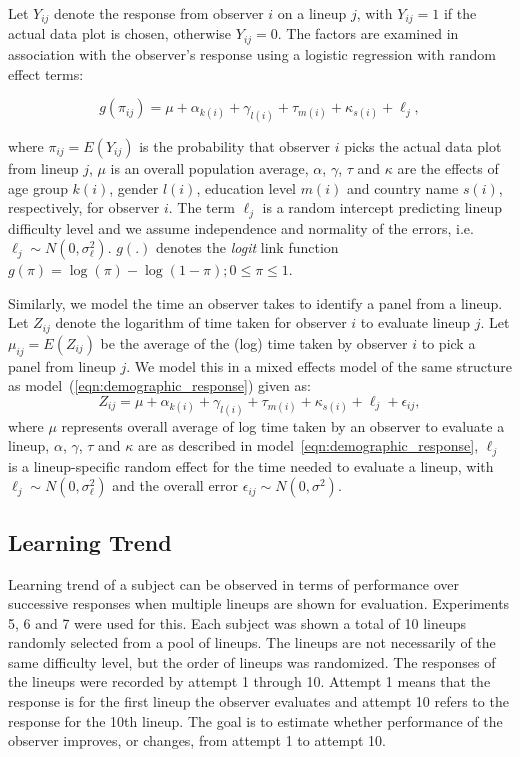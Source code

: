 \documentclass[10pt]{article}\usepackage[]{graphicx}\usepackage[]{xcolor}
\newcommand{\hh}[1]{{\color{magenta} #1}}
\begin{document}
Let $Y_{ij}$ denote the response from observer $i$ on a lineup $j$, with $Y_{ij} =1$ if the actual data plot is chosen, otherwise $Y_{ij} =0$. The factors are examined in association with the observer's response using a logistic regression with random effect terms:

\begin{equation} \label{eqn:demographic_response}
g( \pi_{ij} )= \mu + \alpha_{k(i)} + \gamma_{l(i)} + \tau_{m(i)}+ \kappa_{s(i)} + \ell_j,  
\end{equation}

where $\pi_{ij}=  E(Y_{ij})$ is the probability that  observer $i$ picks the actual data plot from lineup $j$, $\mu$ is an overall population average, $\alpha$, $\gamma$, $\tau$ and  $\kappa$ are the effects of age group $k(i)$, gender $l(i)$, education level $m(i)$ and country name $s(i)$, respectively, for observer $i$. The term $\ell_j$ is a random intercept predicting lineup difficulty level and we assume independence and normality of the errors, i.e.\ $\ell_j \sim N(0, \sigma_\ell^2)$.  $g(.)$ denotes the {\it logit} link function $g(\pi)=\log(\pi) - \log(1-\pi); 0 \le \pi \le 1$.


Similarly, we model the  time  an observer takes to identify a panel from a lineup. Let $Z_{ij}$ denote the logarithm of time taken for  observer $i$ to evaluate  lineup $j$. Let $\mu_{ij}=  E(Z_{ij})$ be the average of the (log) time taken by  observer $i$ to pick a panel from lineup $j$. We model this in a mixed effects model of the same structure as model~(\ref{eqn:demographic_response}) given as:
\begin{equation} \label{eqn:demographic_time}
Z_{ij} = \mu + \alpha_{k(i)} + \gamma_{l(i)} + \tau_{m(i)}+ \kappa_{s(i)} + \ell_j+ \epsilon_{ij},  
\end{equation}
where $\mu$ represents overall average of log time taken by an observer to evaluate a lineup, $\alpha$, $\gamma$, $\tau$ and  $\kappa$ are as described in model~\eqref{eqn:demographic_response}, $\ell_j$ is a lineup-specific random effect for the time needed to evaluate a lineup, with $\ell_j \sim N(0, \sigma_\ell^2)$ and the overall error $\epsilon_{ij} \sim N(0, \sigma^2)$.  

\subsection{Learning Trend} Learning trend of a subject can be observed in terms of performance over successive responses when multiple lineups are shown for evaluation. Experiments 5, 6 and 7 were used for this. Each subject was shown a total of 10 lineups randomly selected from a pool of lineups. The lineups are not necessarily of the same difficulty level, but the order of lineups was randomized. The responses of the lineups were recorded by attempt 1 through 10. Attempt 1 means that the response is for the first lineup the observer evaluates and attempt 10 refers to the response for the 10th lineup. The goal is to estimate whether performance of the observer improves, or changes, from attempt 1 to attempt 10. 
\end{document}
